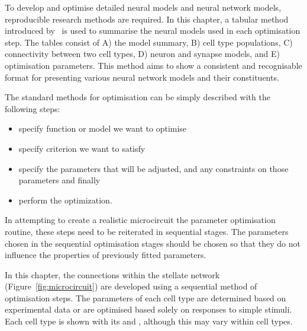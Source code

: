 
To develop and optimise detailed neural models and neural network models,
reproducible research methods are required. In this chapter, a tabular method
introduced by \citet{NordlieGewaltigEtAl:2009}~is used to summarise the neural
models used in each optimisation step. The tables consist of A) the model
summary, B) cell type populations, C) connectivity between two cell types, D)
neuron and synapse models, and E) optimisation parameters.  This method aims to
show a consistent and recognisable format for presenting various neural network
models and their constituents. 


The standard methods for optimisation can be simply described with the following
steps:\begin{itemize}
\item specify function or model we want to optimise
\item specify criterion we want to satisfy
\item specify the parameters that will be adjusted, 
  and any constraints on those parameters and finally
\item perform the optimization.
\end{itemize}
In attempting to create a realistic microcircuit the parameter optimisation
routine, these steps need to be reiterated in sequential stages. The parameters
chosen in the sequential optimisation stages should be chosen so that they do
not influence the properties of previously fitted parameters.


In this chapter, the connections within the stellate network
(Figure~\ref{fig:microcircuit}) are developed using a sequential method of
optimisation steps.  The parameters of each cell type are determined based on
experimental data or are optimised based solely on responses to simple stimuli.
Each cell type is shown with its \EIRA and \PSTH, although this may
vary within cell types.



